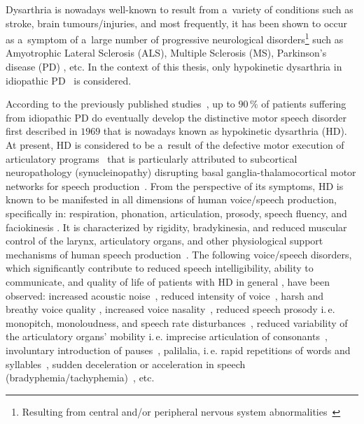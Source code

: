 Dysarthria is nowadays well-known to result from a~variety of conditions such as stroke, brain tumours/injuries, and most frequently, it has been shown to occur as a~symptom of a~large number of progressive neurological disorders\footnote{Resulting from central and/or peripheral nervous system abnormalities~\cite{Pinto2010}} such as Amyotrophic Lateral Sclerosis (ALS), Multiple Sclerosis (MS), Parkinson's disease (PD) \cite{Darley1969, Darley1969b, Darley1975, Murdoch1998}, etc. In the context of this thesis, only hypokinetic dysarthria in idiopathic PD~\cite{Brabenec2017} is considered.

According to the previously published studies~\cite{Ho1999a}, up to $90\,\%$ of patients suffering from idiopathic PD do eventually develop the distinctive motor speech disorder first described in $1969$ \cite{Darley1969, Darley1969b} that is nowadays known as hypokinetic dysarthria (HD). At present, HD is considered to be a~result of the defective motor execution of articulatory programs~\cite{Duffy2015} that is particularly attributed to subcortical neuropathology (synucleinopathy) disrupting basal ganglia-thalamocortical motor networks for speech production~\cite{Fujii2014}. From the perspective of its symptoms, HD is known to be manifested in all dimensions of human voice/speech production, specifically in: respiration, phonation, articulation, prosody, speech fluency, and faciokinesis \cite{Darley1969, Darley1975, Mekyska2011b_eng, Brabenec2017}. It is characterized by rigidity, bradykinesia, and reduced muscular control of the larynx, articulatory organs, and other physiological support mechanisms of human speech production~\cite{Kegl1999}. The following voice/speech disorders, which significantly contribute to reduced speech intelligibility, ability to communicate, and quality of life of patients with HD in general \cite{Pell2006, Hall2011}, have been observed: increased acoustic noise~\cite{Hornykiewicz1998}, reduced intensity of voice~\cite{Baker1998}, harsh and breathy voice quality \cite{Tsanas2010, Tsanas2010b}, increased voice nasality~\cite{Spencer2005}, reduced speech prosody i.\,e. monopitch, monoloudness, and speech rate disturbances~\cite{Brin2009, Skodda2009, Galaz2016}, reduced variability of the articulatory organs' mobility i.\,e. imprecise articulation of consonants~\cite{Roy2009, Gomez2018}, involuntary introduction of pauses~\cite{Moretti2003}, palilalia, i.\,e. rapid repetitions of words and syllables~\cite{Moretti2003}, sudden deceleration or acceleration in speech (bradyphemia/tachyphemia)~\cite{Gentil1995}, etc.

